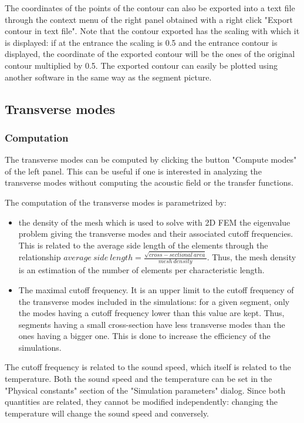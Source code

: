 \documentclass[]{article}
\begin{document}
	The coordinates of the points of the contour can also be exported 
	into a text file through the context menu of the right panel obtained
	with a right click "Export contour in text file". 
	Note that the contour exported has the scaling with which it is 
	displayed: if at the entrance the scaling is 0.5 and the entrance 
	contour is displayed, the coordinate of the exported contour will
	be the ones of the original contour multiplied by 0.5.
	The exported contour can easily be plotted using another software in 
	the same way as the segment picture.
	
	\subsection{Transverse modes}
	
	\subsubsection{Computation}
	
	The transverse modes can be computed by clicking the button
	"Compute modes" of the left panel. This can be useful if one is interested in analyzing the transverse modes without 
	computing the acoustic field or the transfer functions.
	
	The computation of the transverse modes is parametrized by: 
	\begin{itemize}
		\item the density of the mesh which is used to solve with 
		2D \ac{FEM} the 
		eigenvalue problem giving the transverse modes and their 
		associated cutoff frequencies. This is related to the average
		side length of the elements through the relationship
		$average~side~length = \frac{\sqrt{cross-sectional~area}}{mesh~density}$. 
		Thus, the mesh density is an estimation of the number of
		elements per characteristic length.
		\item The maximal cutoff frequency. It is an upper limit to the 
		cutoff frequency of the transverse modes included in the 
		simulations: for a given segment, only the modes having a cutoff
		frequency lower than this value are kept. Thus, segments having 
		a small cross-section have less transverse modes than the ones
		having a bigger one. This is done to increase the efficiency 
		of the simulations.
	\end{itemize}

	The cutoff frequency is related to the sound speed, which itself 
	is related to the temperature. Both the sound speed and the 
	temperature can be set in the "Physical constants" section of 
	the "Simulation parameters" dialog. Since both quantities are
	related, they cannot be modified independently: changing the 
	temperature will change the sound speed and conversely.
\end{document}
